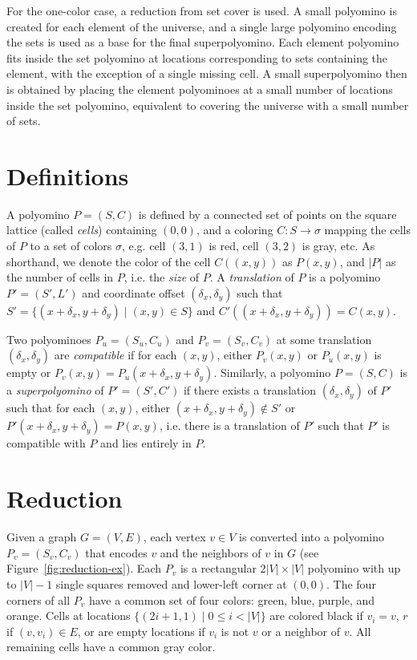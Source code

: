 \documentclass{article}
\begin{document}
For the one-color case, a reduction from set cover is used.
A small polyomino is created for each element of the universe, and a single large polyomino encoding the sets is used as a base for the final superpolyomino.
Each element polyomino fits inside the set polyomino at locations corresponding to sets containing the element, with the exception of a single missing cell.
A small superpolyomino then is obtained by placing the element polyominoes at a small number of locations inside the set polyomino, equivalent to covering the universe with a small number of sets.

\section{Definitions}

A polyomino $P = (S, C)$ is defined by a connected set of points on the square lattice (called \emph{cells}) containing $(0, 0)$, and a coloring $C: S \rightarrow \sigma$ mapping the cells of $P$ to a set of colors $\sigma$, e.g. cell $(3, 1)$ is red, cell $(3, 2)$ is gray, etc.
As shorthand, we denote the color of the cell $C((x, y))$ as $P(x, y)$, and $|P|$ as the number of cells in $P$, i.e. the \emph{size} of $P$.
A \emph{translation} of $P$ is a polyomino $P' = (S', L')$ and coordinate offset $(\delta_x, \delta_y)$ such that $S' = \{(x + \delta_x, y + \delta_y) \mid (x, y) \in S\}$ and $C'((x + \delta_x, y + \delta_y)) = C(x, y)$. 

Two polyominoes $P_u = (S_u, C_u)$ and $P_v = (S_v, C_v)$ at some translation $(\delta_x, \delta_y)$ are \emph{compatible} if for each $(x, y)$, either $P_v(x, y)$ or $P_u(x, y)$ is empty or $P_v(x, y) = P_u(x + \delta_x, y + \delta_y)$.
Similarly, a polyomino $P = (S, C)$ is a \emph{superpolyomino} of $P' = (S', C')$ if there exists a translation $(\delta_x, \delta_y)$ of $P'$ such that for each $(x, y)$, either $(x+\delta_x, y+\delta_y) \not \in S'$ or $P'(x+\delta_x, y+\delta_y) = P(x, y)$, i.e. there is a translation of $P'$ such that $P'$ is compatible with $P$ and lies entirely in $P$. 

\section{Reduction}
\label{sec:reduction}

Given a graph $G = (V, E)$, each vertex $v \in V$ is converted into a polyomino $P_v = (S_v, C_v)$ that encodes $v$ and the neighbors of $v$ in $G$ (see Figure~\ref{fig:reduction-ex}).
Each $P_v$ is a rectangular $2|V| \times |V|$ polyomino with up to $|V|-1$ single squares removed and lower-left corner at $(0, 0)$. 
The four corners of all $P_v$ have a common set of four colors: green, blue, purple, and orange.
Cells at locations $\{(2i + 1, 1) \mid 0 \leq i < |V|\}$ are colored black if $v_i = v$, $r$ if $(v, v_i) \in E$, or are empty locations if $v_i$ is not $v$ or a neighbor of $v$.
All remaining cells have a common gray color.
\end{document}
